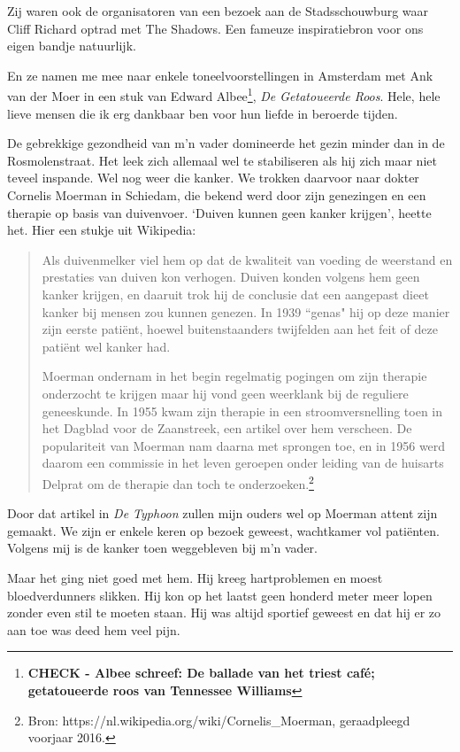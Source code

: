 \documentclass[12pt,twoside]{memoir}
\begin{document}
Zij waren ook de organisatoren van een bezoek aan de Stadsschouwburg waar Cliff Richard optrad met The Shadows. Een fameuze inspiratiebron voor ons eigen bandje natuurlijk. 

En ze namen me mee naar enkele toneelvoorstellingen in Amsterdam met Ank van der Moer in een stuk van Edward Albee\footnote{\bf{CHECK} - Albee schreef: De ballade van het triest café; getatoueerde roos van Tennessee Williams}, \emph{De Getatoueerde Roos}. Hele, hele lieve mensen die ik erg dankbaar ben voor hun liefde in beroerde tijden. 

De gebrekkige gezondheid van m’n vader domineerde het gezin minder dan in de Rosmolenstraat. Het leek zich allemaal wel te stabiliseren als hij zich maar niet teveel inspande. Wel nog weer die kanker. We trokken daarvoor naar dokter Cornelis Moerman in Schiedam, die bekend werd door zijn genezingen en een therapie op basis van duivenvoer. `Duiven kunnen geen kanker krijgen', heette het. Hier een stukje uit Wikipedia:

\begin{quote}
Als duivenmelker viel hem op dat de kwaliteit van voeding de weerstand en prestaties van duiven kon verhogen. Duiven konden volgens hem geen kanker krijgen, en daaruit trok hij de conclusie dat een aangepast dieet kanker bij mensen zou kunnen genezen. In 1939 ``genas" hij op deze manier zijn eerste patiënt, hoewel buitenstaanders twijfelden aan het feit of deze patiënt wel kanker had. 

Moerman ondernam in het begin regelmatig pogingen om zijn therapie onderzocht te krijgen maar hij vond geen weerklank bij de reguliere geneeskunde. In 1955 kwam zijn therapie in een stroomversnelling toen in het Dagblad voor de Zaanstreek,  een artikel over hem verscheen. De populariteit van Moerman nam daarna met sprongen toe, en in 1956 werd daarom een commissie in het leven geroepen onder leiding van de huisarts Delprat om de therapie dan toch te onderzoeken.\footnote{Bron: https://nl.wikipedia.org/wiki/Cornelis_Moerman, geraadpleegd voorjaar 2016.}
\end{quote}

Door dat artikel in \emph{De Typhoon} zullen mijn ouders wel op Moerman attent zijn gemaakt. We zijn er enkele keren op bezoek geweest, wachtkamer vol patiënten. Volgens mij is de kanker toen weggebleven bij m’n vader. 

Maar het ging niet goed met hem. Hij kreeg hartproblemen en moest bloedverdunners slikken. Hij kon op het laatst geen honderd meter meer lopen zonder even stil te moeten staan. Hij was altijd sportief geweest en dat hij er zo aan toe was deed hem veel pijn.
\end{document}
